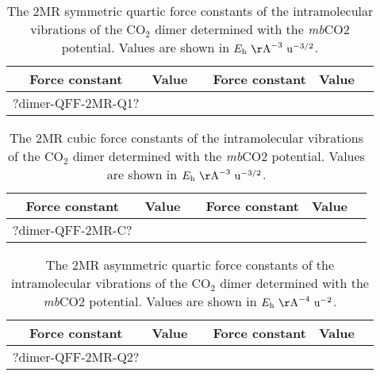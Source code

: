 \documentclass[aip,jcp,showpacs,superscriptaddress,groupedaddress]{revtex4-1}  %
\begin{document}
\begin{table}[]
\centering
\caption{The 2MR symmetric quartic force constants of the intramolecular vibrations of the CO$_2$ dimer determined with the \emph{mb}CO2 potential. Values are shown in $E_{\rm h}\ {\rm \AA}^{-3}\ {\rm u}^{-3/2}$.}
\label{table:qff_dimer-2mr-q1}
\begin{ruledtabular}
\begin{tabular}{cccccc}
Force constant & Value      &  & Force constant & Value      &    \\
\hline \Tstrut
?dimer-QFF-2MR-Q1?
\end{tabular}
\end{ruledtabular}
\end{table}

\begin{table}[H]
\centering
\caption{The 2MR cubic force constants of the intramolecular vibrations of the CO$_2$ dimer determined with the \emph{mb}CO2 potential. Values are shown in $E_{\rm h}\ {\rm \AA}^{-3}\ {\rm u}^{-3/2}$.}
\label{table:qff_dimer-2mr-t}
\begin{ruledtabular}
\begin{tabular}{cccccc}
Force constant & Value      &  & Force constant & Value      &    \\
\hline \Tstrut
?dimer-QFF-2MR-C?
\end{tabular}
\end{ruledtabular}
\end{table}

\begin{table}[]
\centering
\caption{The 2MR asymmetric quartic force constants of the intramolecular vibrations of the CO$_2$ dimer determined with the \emph{mb}CO2 potential. Values are shown in $E_{\rm h}\ {\rm \AA}^{-4}\ {\rm u}^{-2}$.}
\label{table:qff_dimer-2mr-q2}
\begin{ruledtabular}
\begin{tabular}{cccccc}
Force constant & Value      &  & Force constant & Value      &    \\
\hline \Tstrut
?dimer-QFF-2MR-Q2?
\end{tabular}
\end{ruledtabular}
\end{table}
\end{document}
